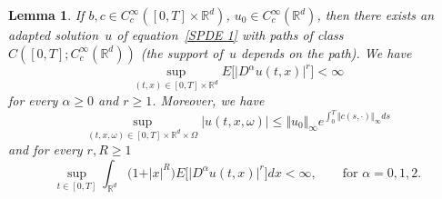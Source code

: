 \documentclass[a4paper,10pt]{article}
\newtheorem{lemma}[theorem]{Lemma}
\newcommand\1{\mathbbm{1}}
\numberwithin{equation}{section}
\begin{document}
\begin{lemma}
\label{lemma preliminare sul caso smooth}
If $b , c\in C_{c}^{\infty}([0,T] \times \mathbb{R}^{d})$, $u_{0} \in C_{c}^{\infty}(\mathbb{R}^{d})$, then there exists an adapted solution~$u$ of equation~\eqref{SPDE 1} with paths of class $C([0,T];C_{c}^{\infty}(\mathbb{R}^{d}))$ \textup{(}the support of~$u$ depends on the path\textup{)}. We have
\begin{equation}
\sup_{(t,x) \in [0,T] \times \mathbb{R}^{d}}E \big[ \vert D^{\alpha}u(t,x) \vert^{r}\big]
<\infty \label{ineq 1 lemma smooth}
\end{equation}
for every $\alpha\geq0$ and $r\geq1$. Moreover, we have
\begin{equation}
\sup_{(t,x,\omega)  \in [0,T] \times \mathbb{R}^{d} \times \Omega} \vert u(t,x,\omega) \vert
\leq \Vert u_{0} \Vert_{\infty} e^{\int_{0}^{T}\Vert c (s,\cdot) \Vert_{\infty} ds} \label{ineq 2 lemma smooth}
\end{equation}
and for every $r,R\geq1$
\begin{equation}
\sup_{t\in [0,T]} \int_{\mathbb{R}^{d}} \big(1+\vert x \vert^{R} \big)  E \big[\vert D^{\alpha} u(t,x) \vert^{r} \big]  dx < \infty,\qquad \text{for }\alpha=0,1,2. 
\label{ineq 3 lemma smooth}
\end{equation}
\end{lemma}
\end{document}
